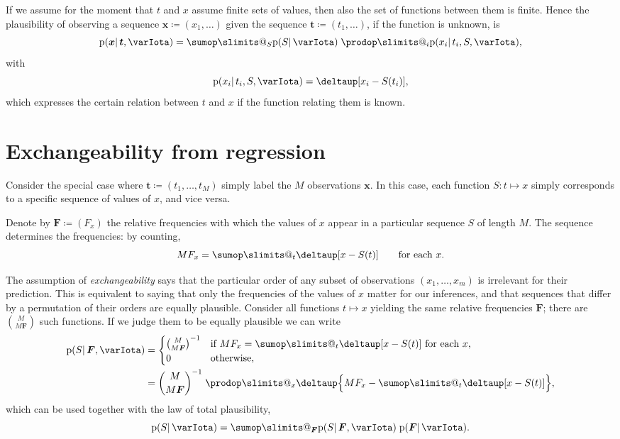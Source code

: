 \documentclass[\ifafour a4paper,12pt,\else a5paper,10pt,\fi%
onecolumn,oneside,article,%
british%
]{memoir}
\makeatletter
\theoremstyle{remark}
\theoremstyle{innote}
\def\sum{\DOTSI\sumop\slimits@}
\def\prod{\DOTSI\prodop\slimits@}
\newcommand*{\delt}{\deltaup}%
\newcommand*{\defd}{\coloneqq}
\newcommand*{\pf}{\mathrm{p}}%
\renewcommand*{\|}{\mathpunct{|}}
\newcommand*{\yI}{\varIota}
\newcommand*{\yx}{\bm{x}}
\newcommand*{\yt}{\bm{t}}
\newcommand*{\yF}{\bm{F}}
\makeatother
\begin{document}
If we assume for the moment that $t$ and $x$ assume finite sets of values,
then also the set of functions between them is finite. Hence the
plausibility of observing a sequence $\yx\defd (x_1,\dotsc)$ given the
sequence $\yt \defd (t_1,\dotsc)$, if the function is unknown, is
\begin{equation}
  \label{eq:x_from_t_marginal_f}
  \pf(\yx \|\yt, \yI) = \sum_S \pf(S \|\yI)\;\prod_i\pf(x_i \| t_i, S, \yI),
\end{equation}
with
\begin{equation}
  \label{eq:x_from_t_given_f_deterministic}
  \pf(x_i \| t_i, S, \yI) = \delt[x_i - S(t_i)],
\end{equation}
which expresses the certain relation between $t$ and $x$ if the function
relating them is known.

\section{Exchangeability from regression}
\label{sec:exch_from_regr}

Consider the special case where $\yt \defd(t_1,\dotsc,t_{M})$ simply label
the $M$ observations $\yx$. In this case, each function
$S\colon t \mapsto x$ simply corresponds to a specific sequence of values
of $x$, and vice versa.

Denote by $\yF \defd (F_{x})$ the relative frequencies with which the
values of $x$ appear in a particular sequence $S$ of length $M$. The
sequence determines the frequencies: by counting,
\begin{equation}
  \label{eq:freqs_from_function}
 M F_{x} = \sum_t \delt[x-S(t)]
  \qquad\text{for each $x$}.
\end{equation}

The assumption of \emph{exchangeability} says that the particular order of
any subset of observations $(x_1,\dotsc,x_{m})$ is irrelevant for their
prediction. This is equivalent to saying that only the frequencies of the
values of $x$ matter for our inferences, and that sequences that differ by
a permutation of their orders are equally plausible. Consider all functions
$t\mapsto x$ yielding the same relative frequencies $\yF$; there are
$\binom{M}{M\yF}$ such functions. If we judge them to be equally plausible
we can write
\begin{equation}
  \label{eq:m_determines_f}
  \begin{split}
  \pf(S \| \yF, \yI) &=
  \begin{cases}
    \binom{M}{M\yF}^{-1} & \text{if $M F_{x}= \sum_t \delt[x-S(t)]$ for each $x$,}\\
    0 &\text{otherwise,}
  \end{cases}
  \\
  &=\binom{M}{M\yF}^{-1}\;  
\prod_{x} \delt\Bigl\{M F_{x} - \sum_{t} \delt[x-S(t)]\Bigr\},
\end{split}
\end{equation}
which can be used together with the law of total plausibility,
\begin{equation}
  \label{eq:total_prob_of_m_with_freqs}
  \pf(S \| \yI) = \sum_{\yF} \pf(S \| \yF, \yI)\; \pf(\yF \| \yI).
\end{equation}
\end{document}
